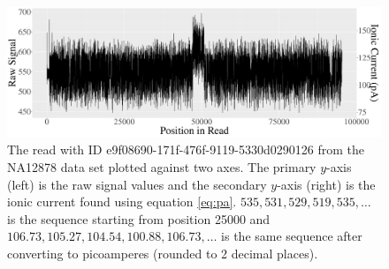 \begin{figure}
\centering
\includegraphics[scale=0.31]{plots/reads.e9f08690-171f-476f-9119-5330d0290126.raw.pa.pdf}
	\caption[The read with ID e9f08690-171f-476f-9119-5330d0290126 from the NA12878 data set.]{\label{fig:read-e9f-pa}The read with ID e9f08690-171f-476f-9119-5330d0290126 from the NA12878 data set plotted against two axes. The primary $y$-axis (left) is the raw signal values and the secondary $y$-axis (right) is the ionic current found using equation \ref{eq:pa}. $535, 531, 529, 519, 535,\dots$ is the sequence starting from position 25000 and $106.73, 105.27, 104.54, 100.88, 106.73,\dots$ is the same sequence after converting to picoamperes (rounded to 2 decimal places).}
\end{figure}
